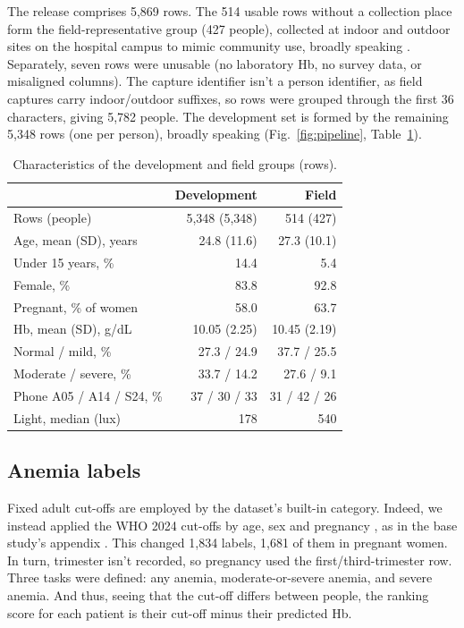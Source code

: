 \documentclass[10pt,a4paper,twocolumn]{article}
\begin{document}
The release comprises 5,869 rows. The 514 usable rows without a collection place form the field-representative group (427 people), collected at indoor and outdoor sites on the hospital campus to mimic community use, broadly speaking \cite{desai2026}. Separately, seven rows were unusable (no laboratory Hb, no survey data, or misaligned columns). The capture identifier isn't a person identifier, as field captures carry indoor/outdoor suffixes, so rows were grouped through the first 36 characters, giving 5,782 people. The development set is formed by the remaining 5,348 rows (one per person), broadly speaking (Fig.~\ref{fig:pipeline}, Table~\ref{tab:cohort}).

\begin{table}[t]
\centering\small
\caption{Characteristics of the development and field groups (rows).}
\label{tab:cohort}
\begin{tabularx}{\columnwidth}{@{}Xrr@{}}
\toprule
 & Development & Field \\
\midrule
Rows (people) & 5,348 (5,348) & 514 (427) \\
Age, mean (SD), years & 24.8 (11.6) & 27.3 (10.1) \\
Under 15 years, \% & 14.4 & 5.4 \\
Female, \% & 83.8 & 92.8 \\
Pregnant, \% of women & 58.0 & 63.7 \\
Hb, mean (SD), g/dL & 10.05 (2.25) & 10.45 (2.19) \\
Normal / mild, \% & 27.3 / 24.9 & 37.7 / 25.5 \\
Moderate / severe, \% & 33.7 / 14.2 & 27.6 / 9.1 \\
Phone A05 / A14 / S24, \% & 37 / 30 / 33 & 31 / 42 / 26 \\
Light, median (lux) & 178 & 540 \\
\bottomrule
\end{tabularx}
\end{table}

\subsection{Anemia labels}
Fixed adult cut-offs are employed by the dataset's built-in category. Indeed, we instead applied the WHO 2024 cut-offs by age, sex and pregnancy \cite{who2024}, as in the base study's appendix \cite{desai2026}. This changed 1,834 labels, 1,681 of them in pregnant women. In turn, trimester isn't recorded, so pregnancy used the first/third-trimester row. Three tasks were defined: any anemia, moderate-or-severe anemia, and severe anemia. And thus, seeing that the cut-off differs between people, the ranking score for each patient is their cut-off minus their predicted Hb.
\end{document}
